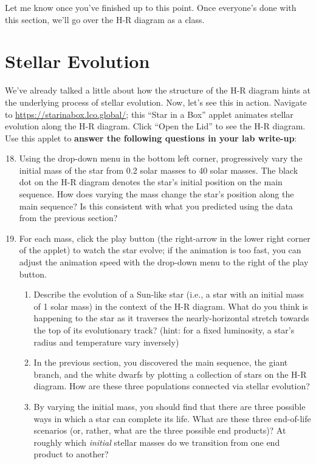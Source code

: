 \documentclass[11pt]{article}
\begin{document}
Let me know once you've finished up to this point. Once everyone's done with this section, we'll go over the H-R diagram as a class.

\section{Stellar Evolution}
We've already talked a little about how the structure of the H-R diagram hints at the underlying process of stellar evolution. Now, let's see this in action. Navigate to \url{https://starinabox.lco.global/}; this ``Star in a Box'' applet animates stellar evolution along the H-R diagram. Click ``Open the Lid'' to see the H-R diagram. Use this applet to \textbf{answer the following questions in your lab write-up}:
\begin{enumerate}
\setcounter{enumi}{17}

    \item Using the drop-down menu in the bottom left corner, progressively vary the initial mass of the star from 0.2 solar masses to 40 solar masses. The black dot on the H-R diagram denotes the star's initial position on the main sequence. How does varying the mass change the star's position along the main sequence? Is this consistent with what you predicted using the data from the previous section?
    
    \item For each mass, click the play button (the right-arrow in the lower right corner of the applet) to watch the star evolve; if the animation is too fast, you can adjust the animation speed with the drop-down menu to the right of the play button.
    \begin{enumerate}
    
        \item Describe the evolution of a Sun-like star (i.e., a star with an initial mass of 1 solar mass) in the context of the H-R diagram. What do you think is happening to the star as it traverses the nearly-horizontal stretch towards the top of its evolutionary track? (hint: for a fixed luminosity, a star's radius and temperature vary inversely)  
        
        \item In the previous section, you discovered the main sequence, the giant branch, and the white dwarfs by plotting a collection of stars on the H-R diagram. How are these three populations connected via stellar evolution?
        
        \item By varying the initial mass, you should find that there are three possible ways in which a star can complete its life. What are these three end-of-life scenarios (or, rather, what are the three possible end products)? At roughly which \emph{initial} stellar masses do we transition from one end product to another?
        

\end{enumerate}
\end{enumerate}
\end{document}

